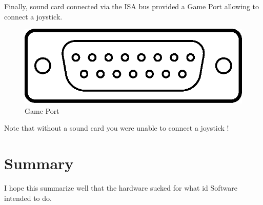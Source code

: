 \documentclass[book.tex]{subfiles}
\begin{document}
Finally, sound card connected via the ISA bus provided a Game Port allowing to connect a joystick.
 \begin{figure}[H]
\centering
\includegraphics[scale=0.9]{imgs/ports/DA-15_GamePort.eps}
%
\caption{Game Port}
\label{fig:gamePort}
\end{figure}

Note that without a sound card you were unable to connect a joystick !



\section{Summary}
I hope this summarize well that the hardware sucked for what id Software intended to do. 
\end{document}
